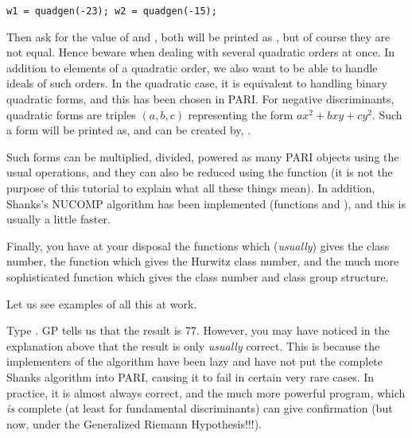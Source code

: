 \centerline{\tt w1 = quadgen(-23); w2 = quadgen(-15);}

Then ask for the value of  and , both will be printed as
, but of course they are not equal. Hence beware when dealing with
several quadratic orders at once. \smallskip
%
In addition to elements of a quadratic order, we also want to be able to
handle ideals of such orders. In the quadratic case, it is equivalent to
handling binary quadratic forms, and this has been chosen in PARI. For
negative discriminants, quadratic forms are triples $(a,b,c)$ representing
the form $ax^2+bxy+cy^2$. Such a form will be printed as, and can be created
by, .

Such forms can be multiplied, divided, powered as many PARI objects using
the usual operations, and they can also be reduced using the function
 (it is not the purpose of this tutorial to explain what all
these things mean). In addition, Shanks's NUCOMP algorithm has been
implemented (functions  and ), and this is
usually a little faster.

Finally, you have at your disposal the functions  which
({\it usually\/}) gives the class number, the function 
which gives the Hurwitz class number, and the much more sophisticated
 function which gives the class number and class group
structure.

Let us see examples of all this at work.

Type . GP tells us that the result is 77. However,
you may have noticed in the explanation above that the result is only
{\it usually\/} correct. This is because the implementers of the algorithm
have been lazy and have not put the complete Shanks algorithm into PARI,
causing it to fail in certain very rare cases. In practice, it is almost
always correct, and the much more powerful  program, which
{\it is} complete (at least for fundamental discriminants) can give
confirmation (but now, under the Generalized Riemann Hypothesis!!!).

